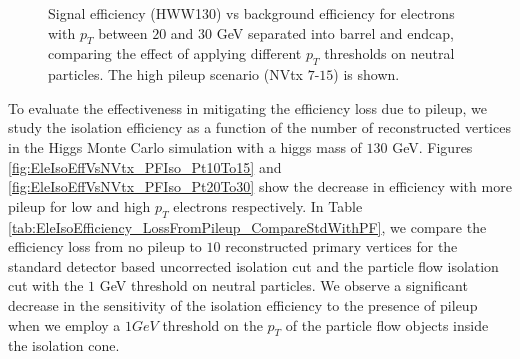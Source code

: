 \begin{figure}[!htbp]
\begin{center}
\caption{Signal efficiency (HWW130) vs background efficiency for electrons with $p_{T}$ between $20$ and $30$ GeV
separated into barrel and endcap, comparing the effect of applying different $p_{T}$ thresholds on neutral particles.
The high pileup scenario (NVtx $7$-$15$) is shown.}
\label{fig:IsoPerformance_Ele_PtThresholds}
\end{center}
\end{figure}


To evaluate the effectiveness in mitigating the efficiency loss due to pileup, we study the isolation
efficiency as a function of the number of reconstructed vertices in the Higgs Monte Carlo simulation with a higgs 
mass of $130$ GeV. Figures \ref{fig:EleIsoEffVsNVtx_PFIso_Pt10To15} and \ref{fig:EleIsoEffVsNVtx_PFIso_Pt20To30}
show the decrease in efficiency with more pileup for low and high $p_{T}$ electrons respectively. In Table 
\ref{tab:EleIsoEfficiency_LossFromPileup_CompareStdWithPF}, we compare the efficiency loss from no pileup 
to $10$ reconstructed primary vertices for the standard detector based uncorrected isolation cut and the 
particle flow isolation cut with the $1$ GeV threshold on neutral particles. We observe a significant decrease
in the sensitivity of the isolation efficiency to the presence of pileup when we employ a $1GeV$ threshold on
the $p_{T}$ of the particle flow objects inside the isolation cone.

